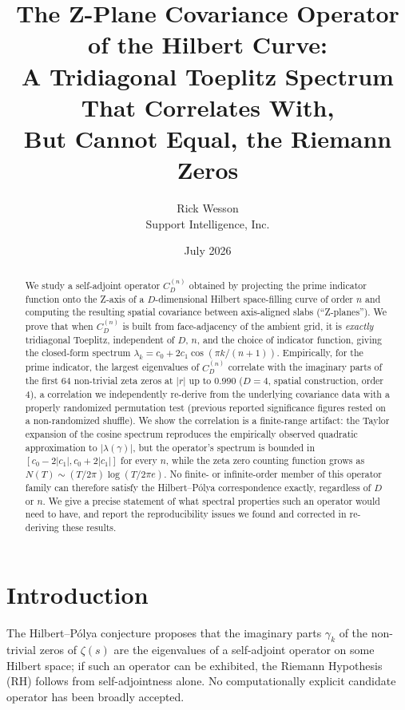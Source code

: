 \documentclass[11pt,a4paper]{article}
\title{The Z-Plane Covariance Operator of the Hilbert Curve:\\
A Tridiagonal Toeplitz Spectrum That Correlates With,\\
But Cannot Equal, the Riemann Zeros}
\author{Rick Wesson\\
Support Intelligence, Inc.}
\date{July 2026}
\begin{document}
\maketitle

\begin{abstract}
We study a self-adjoint operator $C_D^{(n)}$ obtained by projecting the
prime indicator function onto the Z-axis of a $D$-dimensional Hilbert
space-filling curve of order $n$ and computing the resulting spatial
covariance between axis-aligned slabs (``Z-planes''). We prove that when
$C_D^{(n)}$ is built from face-adjacency of the ambient grid, it is
\emph{exactly} tridiagonal Toeplitz, independent of $D$, $n$, and the choice
of indicator function, giving the closed-form spectrum $\lambda_k = c_0 +
2c_1\cos(\pi k/(n+1))$. Empirically, for the prime indicator, the largest
eigenvalues of $C_D^{(n)}$ correlate with the imaginary parts of the first
64 non-trivial zeta zeros at $|r|$ up to $0.990$ ($D=4$, spatial
construction, order 4), a correlation we independently re-derive from the
underlying covariance data with a properly randomized permutation test
(previous reported significance figures rested on a non-randomized shuffle).
We show the correlation is a finite-range artifact: the Taylor expansion of
the cosine spectrum reproduces the empirically observed quadratic
approximation to $|\lambda(\gamma)|$, but the operator's spectrum is bounded
in $[c_0 - 2|c_1|, c_0+2|c_1|]$ for every $n$, while the zeta zero counting
function grows as $N(T) \sim (T/2\pi)\log(T/2\pi e)$. No finite- or
infinite-order member of this operator family can therefore satisfy the
Hilbert--P\'{o}lya correspondence exactly, regardless of $D$ or $n$. We give
a precise statement of what spectral properties such an operator would need
to have, and report the reproducibility issues we found and corrected in
re-deriving these results.
\end{abstract}

\section{Introduction}

The Hilbert--P\'{o}lya conjecture proposes that the imaginary parts
$\gamma_k$ of the non-trivial zeros of $\zeta(s)$ are the eigenvalues of a
self-adjoint operator on some Hilbert space; if such an operator can be
exhibited, the Riemann Hypothesis (RH) follows from self-adjointness alone.
No computationally explicit candidate operator has been broadly accepted.
\end{document}
